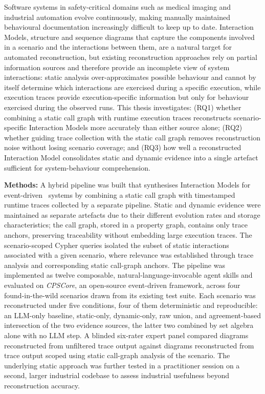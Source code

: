 Software systems in safety-critical domains such as medical imaging and
industrial automation evolve continuously, making manually maintained
behavioural documentation increasingly difficult to keep up to date.
\sysml Interaction Models, structure and sequence diagrams that capture
the components involved in a scenario and the interactions between them,
are a natural target for automated reconstruction, but existing
reconstruction approaches rely on partial information sources and
therefore provide an incomplete view of system interactions: static
analysis over-approximates possible behaviour and cannot by itself
determine which interactions are exercised during a specific execution,
while execution traces provide execution-specific information but only
for behaviour exercised during the observed runs. This thesis
investigates: (RQ1) whether combining a static call graph with runtime
execution traces reconstructs scenario-specific Interaction Models more
accurately than either source alone; (RQ2) whether guiding trace
collection with the static call graph removes reconstruction noise
without losing scenario coverage; and (RQ3) how well a reconstructed
\sysml Interaction Model consolidates static and dynamic evidence into a
single artefact sufficient for system-behaviour comprehension.

\textbf{Methods:} A hybrid pipeline was built that synthesises Interaction
Models for event-driven \Cpp\ systems by combining a static call graph
with timestamped runtime traces collected by a separate pipeline. Static
and dynamic evidence were maintained as separate artefacts due to their
different evolution rates and storage characteristics; the call graph,
stored in a \neo property graph, contains only trace anchors, preserving
traceability without embedding large execution traces. The scenario-scoped
Cypher queries isolated the subset of static interactions associated with
a given scenario, where relevance was established through trace analysis
and corresponding static call-graph anchors. The pipeline was implemented
as twelve composable, natural-language-invocable agent skills and
evaluated on \emph{CPSCore}, an open-source event-driven framework, across
four found-in-the-wild scenarios drawn from its existing test suite. Each
scenario was reconstructed under five conditions, four of them
deterministic and reproducible: an \ac{LLM}-only baseline, static-only,
dynamic-only, raw union, and agreement-based intersection of the two
evidence sources, the latter two combined by set algebra alone with no
LLM step. A
blinded six-rater expert panel compared diagrams reconstructed from
unfiltered trace output against diagrams reconstructed from trace output
scoped using static call-graph analysis of the scenario. The underlying
static approach was further tested in a practitioner session on a second,
larger industrial codebase to assess industrial usefulness beyond
reconstruction accuracy.

